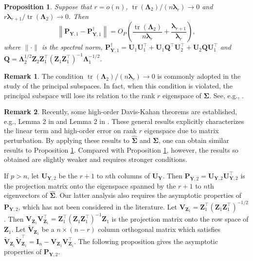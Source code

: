 \documentclass[12pt]{article} %
\DeclareMathOperator{\mytr}{tr}
\newcommand{\bQ}{\mathbf{Q}}
\newcommand{\bZ}{\mathbf{Z}}
\newcommand{\bP}{\mathbf{P}}
\newcommand{\bY}{\mathbf{Y}}
\newcommand{\bI}{\mathbf{I}}
\newcommand{\bU}{\mathbf{U}}
\newcommand{\bV}{\mathbf{V}}
\newcommand{\bfsym}[1]{\ensuremath{\boldsymbol{#1}}}
\def\blambda {\bfsym {\lambda}}
\def\bLambda {\bfsym {\Lambda}}
\def\bSigma {\bfsym {\Sigma}}
\newtheorem{proposition}{Proposition}
\theoremstyle{definition}
\newtheorem{remark}{Remark}
\begin{document}
\begin{proposition}\label{newEigenvectorPropCor}
    Suppose that $r=o(n)$, $\mytr(\bLambda_2)/(n\blambda_r)\to 0$ and $r \blambda_{r+1}/\mytr(\bLambda_2)\to 0$. Then
    \begin{equation*}
        \left\|\bP_{\bY,1} - 
        \bP_{\bY,1}^{\dagger}\right\|
        =O_P\left(\frac{\mytr(\bLambda_2)}{n\blambda_r}+\frac{\blambda_{r+1}}{\blambda_r}\right),
    \end{equation*}
where
$\|\cdot\|$ is the spectral norm,
$
\bP_{\bY,1}^{\dagger}
=\bU_1 \bU_1^\top + \bU_1 \bQ^\top \bU_2^\top
            +\bU_2 \bQ \bU_1^\top
            $ and 
$\bQ
       =
       \bLambda_2^{1/2} \bZ_2 \bZ_1^\top (\bZ_1 \bZ_1^\top)^{-1} \bLambda_1^{-1/2}
       $.
\end{proposition}
\begin{remark}
    The condition $\mytr(\bLambda_2)/(n\blambda_r)\to 0$ is commonly adopted in the study of the principal subspaces.
    In fact, when this condition is violated, the principal subspace will lose its relation to the rank $r$ eigenspace of $\bSigma$. See, e.g., \cite{Nadler2009Finite}.
\end{remark}
\begin{remark}
    Recently, some high-order Davis-Kahan theorems are established, e.g., Lemma 2 in \cite{koltchinskii2016} and Lemma 2 in \cite{fan2017Dist}.
    These general results explicitly characterizes the linear term and high-order error on rank $r$ eigenspace due to matrix perturbation.
    By applying these results to $\hat{\bSigma}$ and $\bSigma$, one can obtain similar results to Proposition \ref{newEigenvectorPropCor}.
    Compared with Proposition \ref{newEigenvectorPropCor},
    however, the results so obtained are slightly weaker and requires stronger conditions. 
\end{remark}

If $p>n$, let $\bU_{\bY,2}$ be the $r+1$ to $n$th columns of $\bU_{\bY}$.
Then $\bP_{\bY,2}=\bU_{\bY,2}\bU_{\bY,2}^\top$ is the projection matrix onto the eigenspace spanned by the $r+1$ to $n$th eigenvectors of $\hat{\bSigma}$.
Our latter analysis also requires the asymptotic properties of $\bP_{\bY,2}$, which has not been considered in the literature.
    Let $\bV_{\bZ_1}=\bZ_1^\top (\bZ_1 \bZ_1^\top)^{-1/2}$.
    Then $\bV_{\bZ_1}\bV_{\bZ_1}^\top=\bZ_1^\top (\bZ_1 \bZ_1^\top)^{-1}\bZ_1$ is the projection matrix onto the row space of $\bZ_1$.
    Let $\tilde{\bV}_{\bZ_1}$ be a $n\times (n-r)$ column orthogonal matrix which satisfies $\tilde{\bV}_{\bZ_1}\tilde{\bV}_{\bZ_1}^\top= \bI_{n}-\bV_{\bZ_1}\bV_{\bZ_1}^\top$.
    The following proposition gives the asymptotic properties of $\bP_{\bY,2}$.
\end{document}
